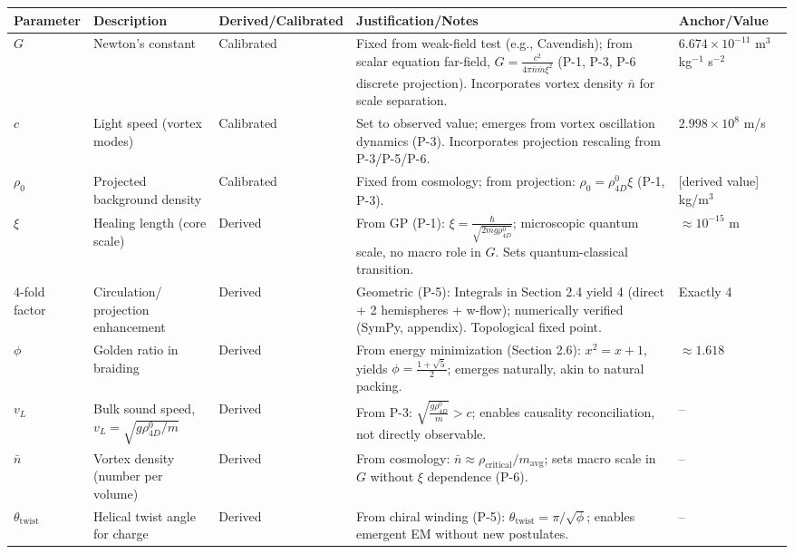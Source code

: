 \begin{table}[H]
\centering
\small
\begin{tabularx}{\linewidth}{|p{1.5cm}|p{2cm}|l|X|p{3cm}|}
\hline
Parameter & Description & Derived/Calibrated & Justification/Notes & Anchor/Value \\
\hline
$G$ & Newton's constant & Calibrated & Fixed from weak-field test (e.g., Cavendish); from scalar equation far-field, $G = \frac{c^2}{4\pi \bar{n} \bar{m} \xi^2}$ (P-1, P-3, P-6 discrete projection). Incorporates vortex density $\bar{n}$ for scale separation. & $6.674 \times 10^{-11}$ m$^3$ kg$^{-1}$ s$^{-2}$ \\
\hline
$c$ & Light speed (vortex modes) & Calibrated & Set to observed value; emerges from vortex oscillation dynamics (P-3). Incorporates projection rescaling from P-3/P-5/P-6. & $2.998 \times 10^8$ m/s \\
\hline
$\rho_0$ & Projected background density & Calibrated & Fixed from cosmology; from projection: $\rho_0 = \rho_{4D}^0 \xi$ (P-1, P-3). & [derived value] kg/m$^3$ \\
\hline
$\xi$ & Healing length (core scale) & Derived & From GP (P-1): $\xi = \frac{\hbar}{\sqrt{2 m g \rho_{4D}^0}}$; microscopic quantum scale, no macro role in $G$. Sets quantum-classical transition. & $\approx 10^{-15}$ m \\
\hline
4-fold factor & Circulation/ projection enhancement & Derived & Geometric (P-5): Integrals in Section 2.4 yield 4 (direct + 2 hemispheres + w-flow); numerically verified (SymPy, appendix). Topological fixed point. & Exactly 4 \\
\hline
$\phi$ & Golden ratio in braiding & Derived & From energy minimization (Section 2.6): $x^2 = x + 1$, yields $\phi = \frac{1 + \sqrt{5}}{2}$; emerges naturally, akin to natural packing. & $\approx 1.618$ \\
\hline
$v_L$ & Bulk sound speed, $v_L = \sqrt{g \rho_{4D}^0 / m}$ & Derived & From P-3: $\sqrt{\frac{g \rho_{4D}^0}{m}} > c$; enables causality reconciliation, not directly observable. & -- \\
\hline
$\bar{n}$ & Vortex density (number per volume) & Derived & From cosmology: $\bar{n} \approx \rho_{\text{critical}} / m_{\text{avg}}$; sets macro scale in $G$ without $\xi$ dependence (P-6). & -- \\
\hline
$\theta_{\text{twist}}$ & Helical twist angle for charge & Derived & From chiral winding (P-5): $\theta_{\text{twist}} = \pi / \sqrt{\phi}$; enables emergent EM without new postulates. & -- \\

\end{tabularx}
\end{table}

